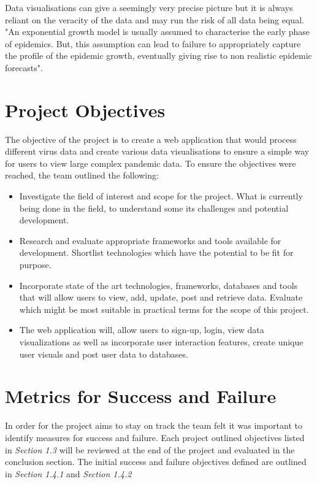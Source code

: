 Data visualisations can give a seemingly very precise picture but it is always reliant on the veracity of the data and may run the risk of all data being equal. "An exponential growth model is usually assumed to characterise the early phase of epidemics. But, this assumption can lead to failure to appropriately capture the profile of the epidemic growth, eventually giving rise to non realistic epidemic forecasts"\cite{tovissode2020use}.



\section{Project Objectives}
The objective of the project is to create a web application that would process different virus data and create various data visualisations to ensure a simple way for users to view large complex pandemic data. 
To ensure the objectives were reached, the team outlined the following:

\begin{itemize}
  \item Investigate the field of interest and scope for the project.
  What is currently being done in the field, to understand some its challenges and potential development.
  
  \item Research and evaluate appropriate frameworks and tools available for development.
  Shortlist technologies which have the potential to be fit for purpose.
  
  \item Incorporate state of the art technologies, frameworks, databases and tools that will allow users to view, add, update, post and retrieve data.
  Evaluate which might be most suitable in practical terms for the scope of this project.
  \item The web application will, allow users to sign-up, login, view data visualizations as well as incorporate user interaction features, create unique user visuals and post user data to databases.
\end{itemize}

\section{Metrics for Success and Failure}
In order for the project aims to stay on track the team felt it was important to identify measures for success and failure.  Each project outlined objectives listed in \emph{Section 1.3} will be reviewed at the end of the project and evaluated in the conclusion section. The initial success and failure objectives defined are outlined in \emph{Section 1.4.1} and \emph{Section 1.4.2}

